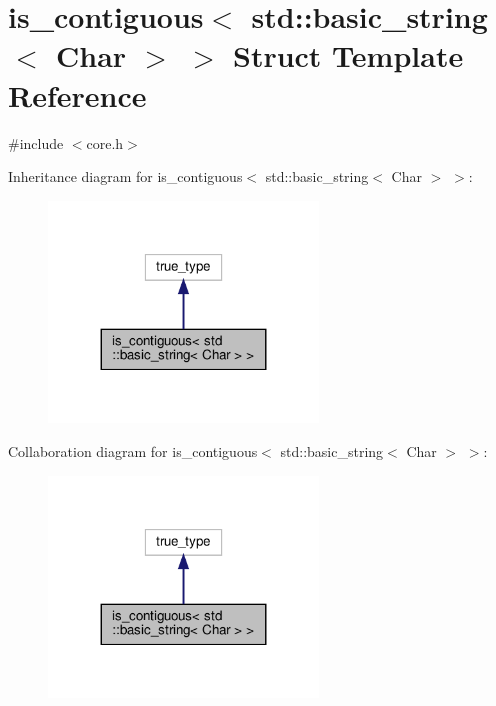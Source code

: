 \hypertarget{structis__contiguous_3_01std_1_1basic__string_3_01_char_01_4_01_4}{}\section{is\+\_\+contiguous$<$ std\+:\+:basic\+\_\+string$<$ Char $>$ $>$ Struct Template Reference}
\label{structis__contiguous_3_01std_1_1basic__string_3_01_char_01_4_01_4}


{\ttfamily \#include $<$core.\+h$>$}



Inheritance diagram for is\+\_\+contiguous$<$ std\+:\+:basic\+\_\+string$<$ Char $>$ $>$\+:
\nopagebreak
\begin{figure}[H]
\begin{center}
\leavevmode
\includegraphics[width=203pt]{structis__contiguous_3_01std_1_1basic__string_3_01_char_01_4_01_4__inherit__graph}
\end{center}
\end{figure}


Collaboration diagram for is\+\_\+contiguous$<$ std\+:\+:basic\+\_\+string$<$ Char $>$ $>$\+:
\nopagebreak
\begin{figure}[H]
\begin{center}
\leavevmode
\includegraphics[width=203pt]{structis__contiguous_3_01std_1_1basic__string_3_01_char_01_4_01_4__coll__graph}
\end{center}
\end{figure}


